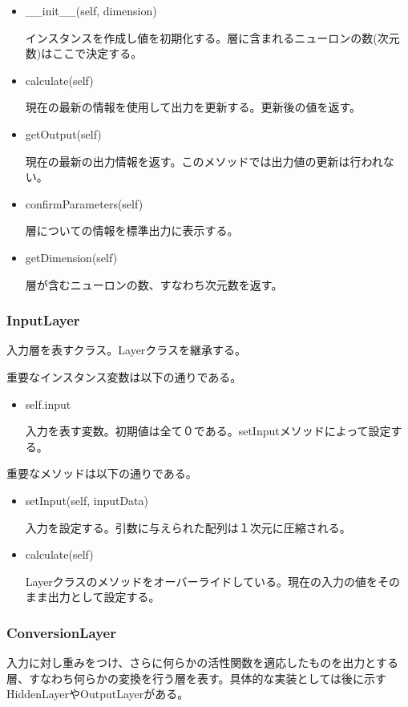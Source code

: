 \documentclass{ujarticle} %
\begin{document}
\begin{itemize}
  \item \_\_init\_\_(self, dimension)

  インスタンスを作成し値を初期化する。層に含まれるニューロンの数(次元数)はここで決定する。

  \item calculate(self)

  現在の最新の情報を使用して出力を更新する。更新後の値を返す。

  \item getOutput(self)

  現在の最新の出力情報を返す。このメソッドでは出力値の更新は行われない。

  \item confirmParameters(self)

  層についての情報を標準出力に表示する。

  \item getDimension(self)

  層が含むニューロンの数、すなわち次元数を返す。
\end{itemize}

\subsubsection{InputLayer}
入力層を表すクラス。Layerクラスを継承する。

重要なインスタンス変数は以下の通りである。
\begin{itemize}
  \item self.input

  入力を表す変数。初期値は全て０である。setInputメソッドによって設定する。
\end{itemize}

重要なメソッドは以下の通りである。

\begin{itemize}
  \item setInput(self, inputData)

  入力を設定する。引数に与えられた配列は１次元に圧縮される。

  \item calculate(self)

  Layerクラスのメソッドをオーバーライドしている。現在の入力の値をそのまま出力として設定する。
\end{itemize}

\subsubsection{ConversionLayer}
入力に対し重みをつけ、さらに何らかの活性関数を適応したものを出力とする層、すなわち何らかの変換を行う層を表す。具体的な実装としては後に示すHiddenLayerやOutputLayerがある。
\end{document}
